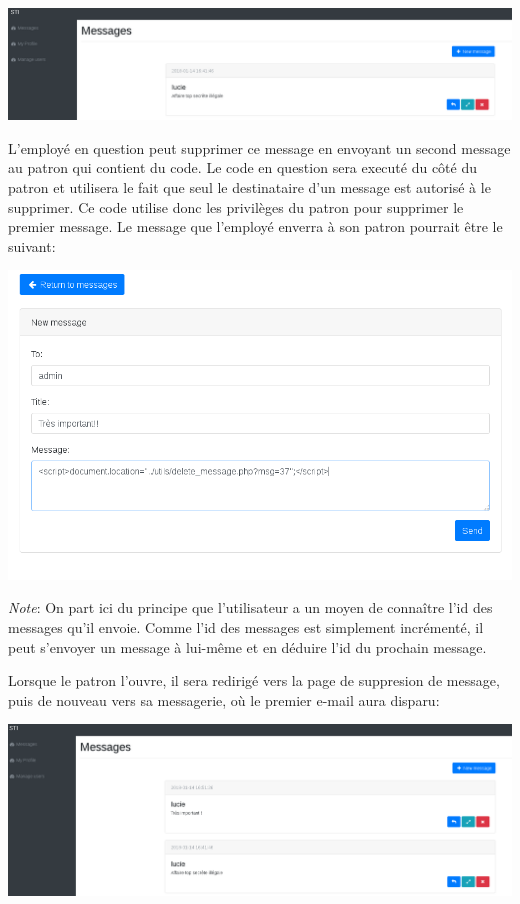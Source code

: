 \documentclass{article}
\begin{document}
\includegraphics[width=\textwidth]{images/delete1.PNG}

L'employé en question peut supprimer ce message en envoyant un second
message au patron qui contient du code. Le code en question sera executé
du côté du patron et utilisera le fait que seul le destinataire d'un
message est autorisé à le supprimer. Ce code utilise donc les privilèges
du patron pour supprimer le premier message. Le message que l'employé
enverra à son patron pourrait être le suivant:

\includegraphics[width=\textwidth]{images/delete2.PNG}

\emph{Note}: On part ici du principe que l'utilisateur a un moyen de
connaître l'id des messages qu'il envoie. Comme l'id des messages est
simplement incrémenté, il peut s'envoyer un message à lui-même et en
déduire l'id du prochain message.

Lorsque le patron l'ouvre, il sera redirigé vers la page de suppresion
de message, puis de nouveau vers sa messagerie, où le premier e-mail
aura disparu:

\includegraphics[width=\textwidth]{images/delete3.PNG}
\end{document}
